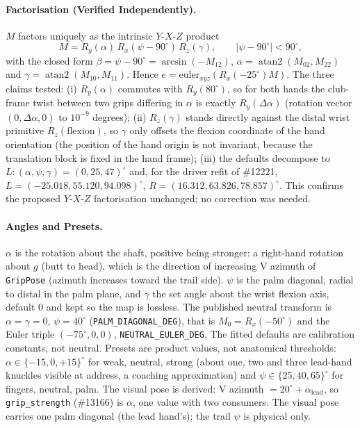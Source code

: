 \documentclass[11pt,a4paper]{article}
\begin{document}
\paragraph{Factorisation (Verified Independently).}
$M$ factors uniquely as the intrinsic $Y$-$X$-$Z$ product
\begin{equation}
M=R_y(\alpha)\,R_x(\psi-90^\circ)\,R_z(\gamma),\qquad |\psi-90^\circ|<90^\circ,
\end{equation}
with the closed form $\beta=\psi-90^\circ=\arcsin(-M_{12})$,
$\alpha=\operatorname{atan2}(M_{02},M_{22})$ and
$\gamma=\operatorname{atan2}(M_{10},M_{11})$. Hence
$e=\mathrm{euler}_{xyz}\!\left(R_x(-25^\circ)M\right)$. The three claims
tested: (i) $R_y(\alpha)$ commutes with $R_y(80^\circ)$, so for both hands the
club-frame twist between two grips differing in $\alpha$ is exactly
$R_y(\Delta\alpha)$ (rotation vector $(0,\Delta\alpha,0)$ to $10^{-9}$ degrees);
(ii) $R_z(\gamma)$ stands directly against the distal wrist primitive
$R_z(\text{flexion})$, so $\gamma$ only offsets the flexion coordinate of the
hand orientation (the position of the hand origin is not invariant, because
the translation block is fixed in the hand frame); (iii) the defaults decompose
to $L:(\alpha,\psi,\gamma)=(0,25,47)^\circ$ and, for the driver refit of \#12221,
$L=(-25.018,55.120,94.098)^\circ$, $R=(16.312,63.826,78.857)^\circ$. This
confirms the proposed $Y$-$X$-$Z$ factorisation unchanged; no correction was
needed.

\paragraph{Angles and Presets.}
$\alpha$ is the rotation about the shaft, positive being stronger: a
right-hand rotation about $g$ (butt to head), which is the direction of
increasing V azimuth of \texttt{GripPose} (azimuth increases toward the trail
side). $\psi$ is the palm diagonal, radial to distal in the palm plane, and
$\gamma$ the set angle about the wrist flexion axis, default $0$ and kept so
the map is lossless. The published neutral transform is $\alpha=\gamma=0$,
$\psi=40^\circ$ (\texttt{PALM\_DIAGONAL\_DEG}), that is $M_0=R_x(-50^\circ)$ and
the Euler triple $(-75^\circ,0,0)$, \texttt{NEUTRAL\_EULER\_DEG}. The fitted
defaults are calibration constants, not neutral. Presets are product values,
not anatomical thresholds: $\alpha\in\{-15,0,+15\}^\circ$ for
weak, neutral, strong (about one, two and three lead-hand knuckles visible at
address, a coaching approximation) and $\psi\in\{25,40,65\}^\circ$ for
fingers, neutral, palm. The visual pose is derived:
V azimuth $=20^\circ+\alpha_{\mathrm{lead}}$, so \texttt{grip\_strength}
(\#13166) is $\alpha$, one value with two consumers. The visual pose carries
one palm diagonal (the lead hand's); the trail $\psi$ is physical only.
\end{document}
